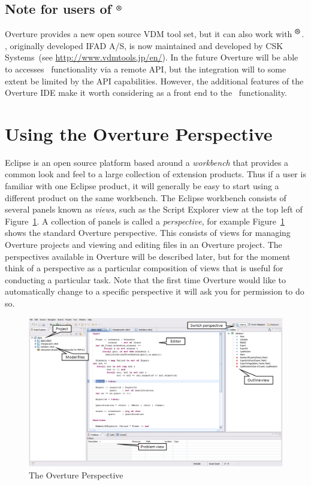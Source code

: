 {\subsection*{Note for users of \vdmtools$^{\mbox{\small\textbf{{\textregistered}}}}$}
Overture provides a new open source VDM tool set, but it can
also work with
\vdmtools$^{\mbox{\small\textbf{{\textregistered}}}}$. \vdmtools, originally developed IFAD A/S, is now
maintained and developed by CSK Systems~(see
\url{http://www.vdmtools.jp/en/}). In the future Overture will be able
to accesses
\vdmtools\ functionality via a remote API, but the integration will to
some extent be limited by the API capabilities. However, the additional
features of the Overture IDE make it worth considering as a front end
to the \vdmtools\ functionality.

\section{Using the Overture Perspective}\label{sec:vdmsupport}

Eclipse is an open source platform based around a \emph{workbench}
that provides a common look and feel to a large collection of
extension products. Thus if a user is familiar with one Eclipse
product, it will generally be easy to start using a different product
on the same workbench. The Eclipse workbench consists of several
panels known as \emph{views}, such as the Script Explorer view at the
top left of Figure~\ref{fig:OverturePerspective}. A
collection of panels is called a \emph{perspective}, for example
Figure~\ref{fig:OverturePerspective} shows the standard
Overture perspective. This consists of views for managing Overture
projects and viewing and editing files in an Overture project. The perspectives
available in Overture will be described later, but for the moment
think of a perspective as a particular composition of views that is
useful for conducting a particular task. Note that the first time
Overture would like to automatically change to a specific perspective
it will ask you for permission to do so.

\begin{figure}[tbh]
\begin{center}
  \includegraphics[width=5.5in]{figures/OverturePerspective}
  \caption[labelInTOC]{The Overture Perspective}
  \label{fig:OverturePerspective}
\end{center}
\end{figure}

}
